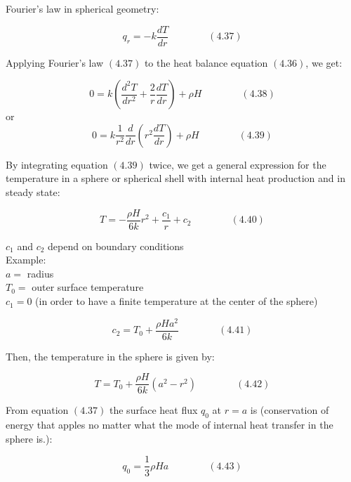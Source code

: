 \documentclass[12pt]{article}
\begin{document}
Fourier's law in spherical geometry:

$${q}_{r} = -k \frac{dT}{dr} \qquad \qquad (4.37)$$

Applying Fourier's law $(4.37)$ to the heat balance equation $(4.36)$, we get:

$$0 = k \left(\frac{{d}^{2}T}{d{r}^{2}} + \frac{2}{r} \frac{dT}{dr} \right) + \rho H \qquad \qquad (4.38)$$
or
$$0 = k \frac{1}{{r}^{2}} \frac{d}{dr} \left({r}^{2}\frac{dT}{dr} \right) + \rho H \qquad \qquad (4.39)$$

By integrating equation $(4.39)$ twice, we get a general expression for the temperature in a sphere or spherical shell with internal heat production and in steady state:

$$T = - \frac{\rho H}{6k} {r}^{2} + \frac{{c}_{1}}{r} + {c}_{2} \qquad \qquad (4.40) $$

${c}_{1}$ and ${c}_{2}$ depend on boundary conditions\\

Example:\\
$a = $ radius\\
${T}_{0} = $ outer surface temperature\\
${c}_{1} = 0$ (in order to have a finite temperature at the center of the sphere)

$${c}_{2} = {T}_{0} + \frac{\rho H {a}^{2}}{6k} \qquad \qquad (4.41)$$

Then, the temperature in the sphere is given by:

$$T = {T}_{0} + \frac{\rho H}{6k} \left( {a}^{2} - {r}^{2} \right) \qquad \qquad (4.42)$$

From equation $(4.37)$ the surface heat flux ${q}_{0}$ at $r = a$ is (conservation of energy that apples no matter what the mode of internal heat transfer in the sphere is.):

$${q}_{0} = \frac{1}{3} \rho H a \qquad \qquad (4.43)$$
\end{document}
